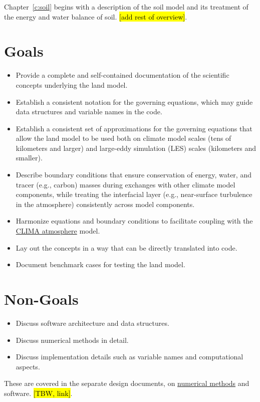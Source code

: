 \documentclass{report}
\begin{document}
Chapter~\ref{c:soil} begins with a description of the soil model and its treatment of the energy and water balance of soil. \hl{[add rest of overview]}.

\section{Goals}

\begin{itemize}
    \item Provide a complete and self-contained documentation of the scientific concepts underlying the land model.
    \item Establish a consistent notation for the governing equations, which may guide data structures and variable names in the code.
    \item Establish a consistent set of approximations for the governing equations that allow the land model to be used both on climate model scales (tens of kilometers and larger) and large-eddy simulation (LES) scales (kilometers and smaller).
    \item Describe boundary conditions that ensure conservation of energy, water, and tracer (e.g., carbon) masses during exchanges with other climate model components, while treating the interfacial layer (e.g., near-surface turbulence in the atmosphere) consistently across model components.
    \item Harmonize equations and boundary conditions to facilitate coupling with the \href{https://github.com/climate-machine/Design-Docs/blob/master/CLIMA-atmos/}{CLIMA atmosphere} model.
    \item Lay out the concepts in a way that can be directly translated into code.
    \item Document benchmark cases for testing the land model.
\end{itemize}

\section{Non-Goals}

\begin{itemize}
    \item Discuss software architecture and data structures.
    \item Discuss numerical methods in detail.
    \item Discuss implementation details such as variable names and computational aspects.
\end{itemize}
These are covered in the separate design documents, on \href{https://github.com/climate-machine/Design-Docs/tree/master/CLIMA-numerics}{numerical methods} and software. \hl{[TBW, link]}.
\end{document}
